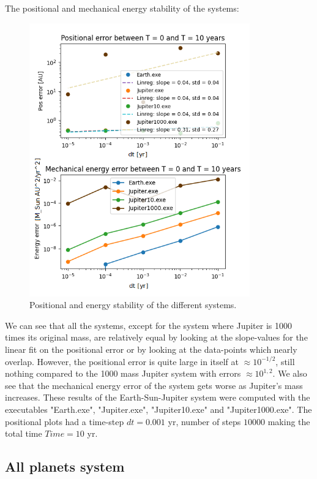 \documentclass[american,a4paper,12pt]{article}
\begin{document}
\newpage
The positional and mechanical energy stability of the systems:
\begin{figure}[H]
    \centering
    \includegraphics[width=0.85\textwidth]{figures/Earth_Jupiter_stability.png}
    \caption{Positional and energy stability of the different systems.}
    \label{fig:ESJ_stability}
\end{figure}
We can see that all the systems, except for the system where Jupiter is 1000 times its original mass, are relatively equal by looking at the slope-values for the linear fit on the positional error or by looking at the data-points which nearly overlap. However, the positional error is quite large in itself at $\approx 10^{-1/2}$, still nothing compared to the 1000 mass Jupiter system with errors $\approx 10^{1,2}$. We also see that the mechanical energy error of the system gets worse as Jupiter's mass increases. These results of the Earth-Sun-Jupiter system were computed with the executables "Earth.exe", "Jupiter.exe", "Jupiter10.exe" and "Jupiter1000.exe". The positional plots had a time-step $dt = 0.001$ yr, number of steps $10000$ making the total time $Time = 10$ yr.

\newpage
\subsection{All planets system}
\end{document}
